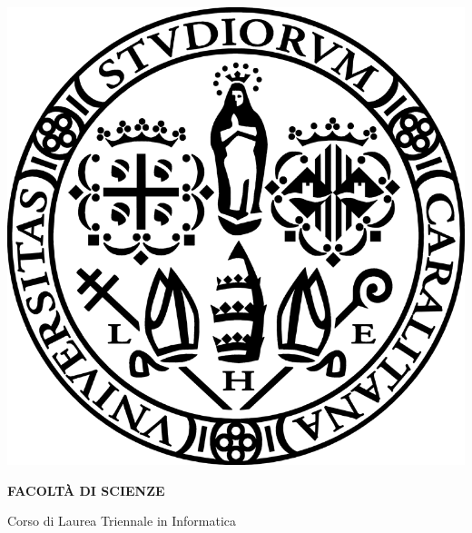 \begin{spacing}{0.90}
\begin{center}
{\Large \thispagestyle{empty}}{\includegraphics[scale=0.18]{images/unicalogo}}\par
\end{center}
\end{spacing}

\noindent 
\begin{center}
\vspace{0.7cm}
\textbf{}\par
\end{center}{\LARGE \par}

\noindent 
\begin{center}
\textbf{\large FACOLT\`A DI SCIENZE}\par
\end{center}{\large \par}

\noindent
\begin{center}
{\large Corso di Laurea Triennale in Informatica}\par  %
\end{center}{\large \par}

